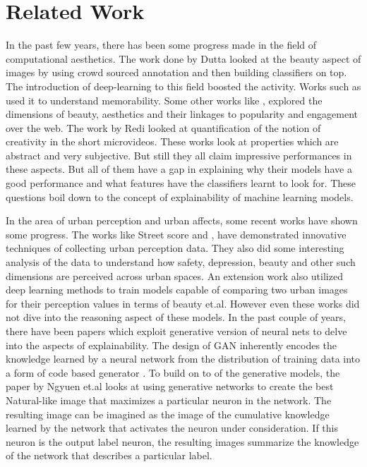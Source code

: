 \section{Related Work}
In the past few years, there has been some progress made in the field of computational aesthetics. The work done by Dutta \cite{datta2008algorithmic} looked at the beauty aspect of images by using crowd sourced annotation and then building classifiers on top. The introduction of deep-learning to this field boosted the activity. Works such as \cite{Isola2011} used it to understand memorability. Some other works like \cite{khosla2014makes} \cite{Wang:2015:USA:2832415.2832579} \cite{schifanella2015image} , explored the dimensions of beauty, aesthetics and their linkages to popularity and engagement over the web. The work by Redi \cite{redi20146} looked at quantification of the notion of creativity in the short microvideos. These works look at properties which are abstract and very subjective. But still they all claim impressive performances in these aspects. But all of them have a gap in explaining why their models have a good performance and what features have the classifiers learnt to look for. These questions boil down to the concept of explainability of machine learning models. 
\par
In the area of urban perception and urban affects, some recent works have shown some progress. The works like Street score \cite{naik2014streetscore} and  \cite{salesses2013collaborative}, have demonstrated innovative techniques of collecting urban perception data. They also did some interesting analysis of the data to understand how safety, depression, beauty and other such dimensions are perceived across urban spaces. An extension work  \cite{dubey2016deep} also utilized deep learning methods to train models capable of comparing two urban images for their perception values in terms of beauty et.al. However even these works did not dive into the reasoning aspect of these models.
In the past couple of years, there have been papers which exploit generative version of neural nets to delve into the aspects of explainability.
The design of GAN inherently encodes the knowledge learned by a neural network from the distribution of training data into a form of code based generator \cite{goodfellow2014generative}. To build on to of the generative models, the paper by Ngyuen et.al \cite{nguyen2016synthesizing} looks at using generative networks to create the best Natural-like image that maximizes a particular neuron in the network. The resulting image can be imagined as the image of the cumulative knowledge learned by the network that activates the neuron under consideration. If this neuron is the output label neuron, the resulting images summarize the knowledge of the network that describes a particular label.

